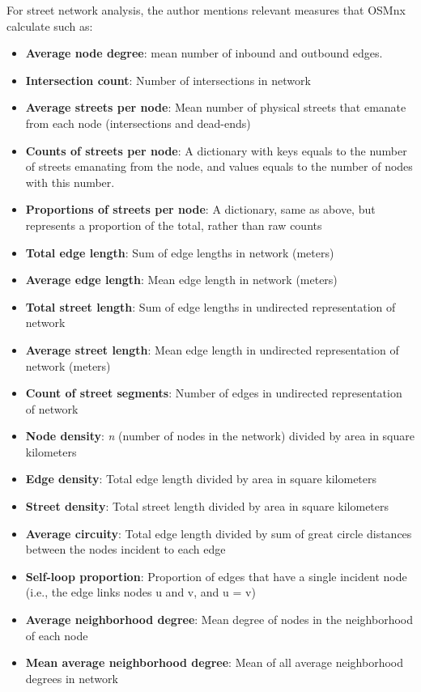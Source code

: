 \documentclass[12pt, letterpaper]{article}
\begin{document}
	For street network analysis, the author mentions relevant measures that OSMnx calculate such as:
	\begin{itemize}
		\item \textbf{Average node degree}: mean number of inbound and outbound edges.
		\item \textbf{Intersection count}: Number of intersections in network
		\item \textbf{Average streets per node}: Mean number of physical streets that emanate from each node (intersections and dead-ends)
		\item \textbf{Counts of streets per node}: A dictionary with keys equals to the number of streets emanating from the node, and values equals to the number of nodes with this number.
		\item \textbf{Proportions of streets per node}: A dictionary, same as above, but represents a proportion of the total, rather than raw counts
		\item \textbf{Total edge length}: Sum of edge lengths in network (meters)
		\item \textbf{Average edge length}: Mean edge length in network (meters)
		\item \textbf{Total street length}: Sum of edge lengths in undirected representation of network
		\item \textbf{Average street length}: Mean edge length in undirected representation of network (meters)
		\item \textbf{Count of street segments}: Number of edges in undirected representation of network
		\item \textbf{Node density}: \textit{n} (number of nodes in the network) divided by area in square kilometers
		\item \textbf{Edge density}: Total edge length divided by area in square kilometers
		\item \textbf{Street density}: Total street length divided by area in square kilometers
		\item \textbf{Average circuity}: Total edge length divided by sum of great circle distances between the nodes incident to each edge
		\item \textbf{Self-loop proportion}: Proportion of edges that have a single incident node (i.e., the edge links nodes u and v, and u = v)
		\item \textbf{Average neighborhood degree}: Mean degree of nodes in the neighborhood of each node
		\item \textbf{Mean average neighborhood degree}: Mean of all average neighborhood degrees in network

\end{itemize}
\end{document}
